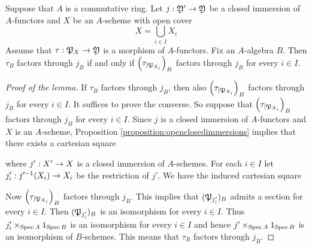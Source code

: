 \begin{lemma}\label{lemma:coveringsandfactorizations}
Suppose that $A$ is a commutative ring. Let $j:{\mathfrak Y}'\rightarrow {\mathfrak Y}$ be a closed immersion of $A$-functors and $X$ be an $A$-scheme with open cover
$$X=\bigcup_{i\in I}X_i$$
Assume that $\tau:{\mathfrak P}_X\rightarrow {\mathfrak Y}$ is a morphism of $A$-functors. Fix an $A$-algebra $B$. Then $\tau_B$ factors through $j_B$ if and only if $\left(\tau_{\mid {\mathfrak P}_{X_i}}\right)_B$ factors through $j_B$ for every $i\in I$.
\end{lemma}
\begin{proof}[Proof of the lemma]
If $\tau_B$ factors through $j_B$, then also $\left(\tau_{\mid {\mathfrak P}_{X_i}}\right)_B$ factors through $j_B$ for every $i\in I$. It suffices to prove the converse. So suppose that $\left(\tau_{\mid {\mathfrak P}_{X_i}}\right)_B$ factors through $j_B$ for every $i\in I$. Since $j$ is a closed immersion of $A$-functors and $X$ is an $A$-scheme, Proposition \ref{proposition:openclosedimmersions} implies that there exists a cartesian square
\begin{center}
\end{center}
where $j':X'\rightarrow X$ is a closed immersion of $A$-schemes. For each $i\in I$ let $j'_i:j'^{-1}(X_i)\rightarrow X_i$ be the restriction of $j'$. We have the induced cartesian square
\begin{center}
\end{center}
Now $\left(\tau_{\mid {\mathfrak P}_{X_i}}\right)_B$ factors through $j_B$. This implies that $({\mathfrak P}_{j'_i})_B$ admits a section for every $i\in I$. Then $({\mathfrak P}_{j'_i})_B$ is an isomorphism for every $i\in I$. Thus $j'_i\times_{\mathrm{Spec}\, A}1_{\mathrm{Spec}\, B}$ is an isomorphism for every $i\in I$ and hence $j'\times_{\mathrm{Spec}\, A}1_{\mathrm{Spec}\, B}$ is an isomorphism of $B$-schemes. This means that $\tau_B$ factors through $j_B$.
\end{proof}

